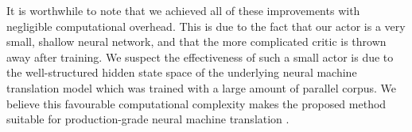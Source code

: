 It is worthwhile to note that we achieved all of these improvements with negligible computational overhead. This is due to the fact that our actor is a very small, shallow neural network, and that the more complicated critic is thrown away after training. We suspect the effectiveness of such a small actor is due to the well-structured hidden state space of the underlying neural machine translation model which was trained with a large amount of parallel corpus. We believe this favourable computational complexity makes the proposed method suitable for production-grade neural machine translation \citep{wu2016google,crego2016systran}.





